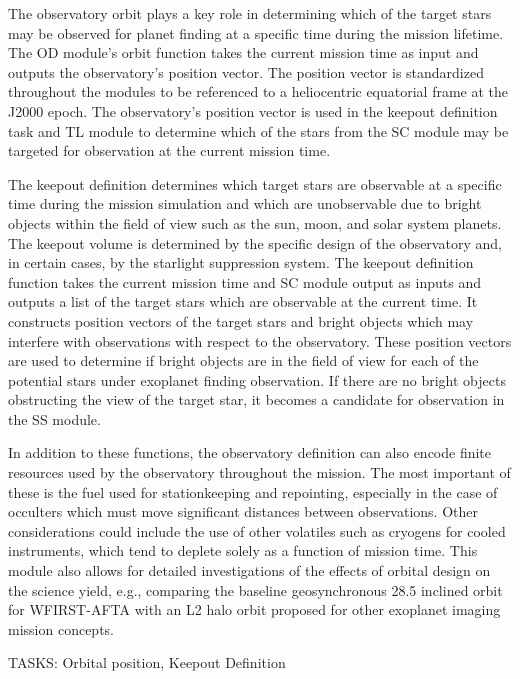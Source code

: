 \documentclass[cleanfoot]{asme2ej}
\begin{document}
The observatory orbit plays a key role in determining which of the target stars may be observed for planet finding at a specific time during the mission lifetime. The OD module's orbit function takes the current mission time as input and outputs the observatory's position vector. The position vector is standardized throughout the modules to be referenced to a heliocentric equatorial frame at the J2000 epoch. The observatory's position vector is used in the keepout definition task and TL module to determine which of the stars from the SC module may be targeted for observation at the current mission time.

The keepout definition determines which target stars are observable at a specific time during the mission simulation and which are unobservable due to bright objects within the field of view such as the sun, moon, and solar system planets.  The keepout volume is determined by the specific design of the observatory and, in certain cases, by the starlight suppression system.  The keepout definition function takes the current mission time and SC module output as inputs and outputs a list of the target stars which are observable at the current time. It constructs position vectors of the target stars and bright objects which may interfere with observations with respect to the observatory. These position vectors are used to determine if bright objects are in the field of view for each of the potential stars under exoplanet finding observation.  If there are no bright objects obstructing the view of the target star, it becomes a candidate for observation in the SS module.

In addition to these functions, the observatory definition can also encode finite resources used by the observatory throughout the mission.  The most important of these is the fuel used for stationkeeping and repointing, especially in the case of occulters which must move significant distances between observations.  Other considerations could include the use of other volatiles such as cryogens for cooled instruments, which tend to deplete solely as a function of mission time.  This module also allows for detailed investigations of the effects of orbital design on the science yield, e.g., comparing the baseline geosynchronous 28.5\textdegree{} inclined orbit for WFIRST-AFTA with an L2 halo orbit proposed for other exoplanet imaging mission concepts. 


TASKS: Orbital position, Keepout Definition
\end{document}
